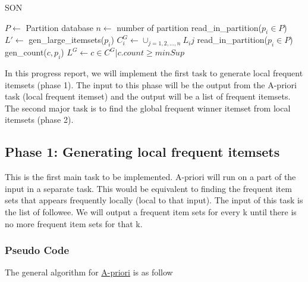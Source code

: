 \documentclass[11pt]{article}
\begin{document}
\begin{algorithm}[H]
    \caption{SON}

    \begin{algorithmic}[1]
        \State $P \gets $ Partition database
        \State $n \gets $ number of partition
        \State
         
            \State read\_in\_partition($p_i \in P$)
            \State $L' \gets$ gen\_large\_itemsets($p_i$)
        \EndFor
            \State $C_{i}^{G} \gets \cup_{j=1,2,...,n}L_{i}{j}$ 
        \EndFor
         
            \State read\_in\_partition($p_i \in P$)
                gen\_count($c, p_i$)
            \EndFor
        \EndFor
        \State $L^G \gets {c \in C^G|c.count \geq minSup}$
    \end{algorithmic}
\end{algorithm}
In this progress report, we will implement the first task to generate local frequent itemsets (phase 1).
The input to this phase will be the output from the A-priori task (local frequent itemset) and the output will be a list of frequent itemsets.
The second major task is to find the global frequent winner itemset from local itemsets (phase 2).

\subsection{Phase 1: Generating local frequent itemsets}

This is the first main task to be implemented.
A-priori will run on a part of the input in a separate task.
This would be equivalent to finding the frequent item sets that appears frequently locally (local to that input).
The input of this task is the list of followee.
We will output a frequent item sets for every k until there is no more frequent item sets for that k.

\subsubsection {Pseudo Code}
The general algorithm for \href{https://www3.cs.stonybrook.edu/~cse634/lecture_notes/07apriori.pdf}{A-priori} is as follow \\
\end{document}
